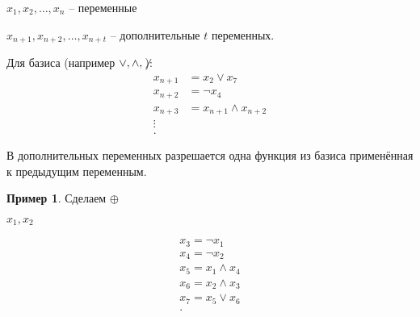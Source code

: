 \documentclass{book}
\theoremstyle{definition}
\newtheorem*{example}{Пример}
\begin{document}
\begin{definition}
    $x_1, x_2, \ldots, x_{n} $ -- переменные

    $x_{n+1}, x_{n+2}, \ldots, x_{n+t} $ -- дополнительные $t$ переменных.

    Для базиса (например $\lor, \land, \not$):
     \begin{equation*}
     \begin{split}
         x_{n+1} &=x_2\lor x_7\\
         x_{n+2} &= \neg x_4\\
         x_{n+3} &= x_{n+1}\land x_{n+2}\\
        \vdots&\\
    .\end{split}
     \end{equation*}

    В дополнительных переменных разрешается одна функция из базиса применённая к предыдущим переменным.
\end{definition}
\begin{example}
    Сделаем $\oplus$

    $x_1, x_2$

    \begin{align*}
        x_3=\neg x_1\\
        x_4=\neg x_2\\
        x_5=x_1\land x_4\\
        x_6=x_2\land x_3\\
        x_7=x_5\lor x_6\\
    .\end{align*}

\end{example}
\end{document}
